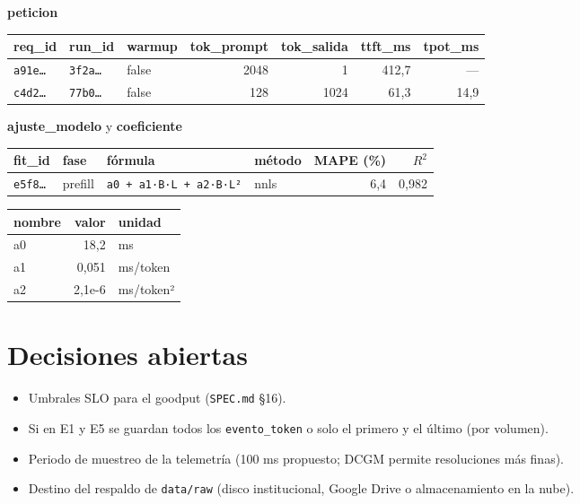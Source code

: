 \documentclass[11pt,a4paper]{article}
\begin{document}
\vspace{0.8em}
\textbf{peticion}\\[2pt]
\begin{tabular}{@{}lllrrrr@{}}
\toprule
req\_id & run\_id & warmup & tok\_prompt & tok\_salida & ttft\_ms & tpot\_ms\\
\midrule
\texttt{a91e…} & \texttt{3f2a…} & false & 2048 & 1 & 412,7 & —\\
\texttt{c4d2…} & \texttt{77b0…} & false & 128 & 1024 & 61,3 & 14,9\\
\bottomrule
\end{tabular}

\vspace{0.8em}
\textbf{ajuste\_modelo} y \textbf{coeficiente}\\[2pt]
\begin{tabular}{@{}llllrr@{}}
\toprule
fit\_id & fase & fórmula & método & MAPE (\%) & $R^2$\\
\midrule
\texttt{e5f8…} & prefill & \texttt{a0 + a1·B·L + a2·B·L²} & nnls & 6,4 & 0,982\\
\bottomrule
\end{tabular}
\quad
\begin{tabular}{@{}lrl@{}}
\toprule
nombre & valor & unidad\\
\midrule
a0 & 18,2 & ms\\
a1 & 0,051 & ms/token\\
a2 & 2,1e-6 & ms/token²\\
\bottomrule
\end{tabular}
\normalsize

\section{Decisiones abiertas}
\begin{itemize}[nosep]
  \item Umbrales SLO para el goodput (\texttt{SPEC.md} §16).
  \item Si en E1 y E5 se guardan todos los \texttt{evento_token} o solo el primero y el último (por volumen).
  \item Periodo de muestreo de la telemetría (100 ms propuesto; DCGM permite resoluciones más finas).
  \item Destino del respaldo de \texttt{data/raw} (disco institucional, Google Drive o almacenamiento en la nube).
\end{itemize}
\end{document}

